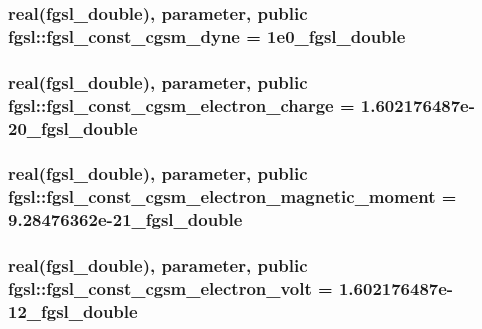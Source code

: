 \hypertarget{classfgsl_a9d4d18eee80940b4fda61ccf8eb7a0a1}{
\subsubsection[{fgsl\-\_\-const\-\_\-cgsm\-\_\-dyne}]{\setlength{\rightskip}{0pt plus 5cm}real({\bf fgsl\-\_\-double}), parameter, public fgsl\-::fgsl\-\_\-const\-\_\-cgsm\-\_\-dyne = 1e0\-\_\-fgsl\-\_\-double}}\label{classfgsl_a9d4d18eee80940b4fda61ccf8eb7a0a1}
\hypertarget{classfgsl_a5dafed1eec73194b34fc66d1e9337dc3}{
\subsubsection[{fgsl\-\_\-const\-\_\-cgsm\-\_\-electron\-\_\-charge}]{\setlength{\rightskip}{0pt plus 5cm}real({\bf fgsl\-\_\-double}), parameter, public fgsl\-::fgsl\-\_\-const\-\_\-cgsm\-\_\-electron\-\_\-charge = 1.\-602176487e-\/20\-\_\-fgsl\-\_\-double}}\label{classfgsl_a5dafed1eec73194b34fc66d1e9337dc3}
\hypertarget{classfgsl_aeef2a928302f3601b87ba01c486de9bd}{
\subsubsection[{fgsl\-\_\-const\-\_\-cgsm\-\_\-electron\-\_\-magnetic\-\_\-moment}]{\setlength{\rightskip}{0pt plus 5cm}real({\bf fgsl\-\_\-double}), parameter, public fgsl\-::fgsl\-\_\-const\-\_\-cgsm\-\_\-electron\-\_\-magnetic\-\_\-moment = 9.\-28476362e-\/21\-\_\-fgsl\-\_\-double}}\label{classfgsl_aeef2a928302f3601b87ba01c486de9bd}
\hypertarget{classfgsl_aeec1dd933fc3bc5a582363056455d46c}{
\subsubsection[{fgsl\-\_\-const\-\_\-cgsm\-\_\-electron\-\_\-volt}]{\setlength{\rightskip}{0pt plus 5cm}real({\bf fgsl\-\_\-double}), parameter, public fgsl\-::fgsl\-\_\-const\-\_\-cgsm\-\_\-electron\-\_\-volt = 1.\-602176487e-\/12\-\_\-fgsl\-\_\-double}}\label{classfgsl_aeec1dd933fc3bc5a582363056455d46c}
